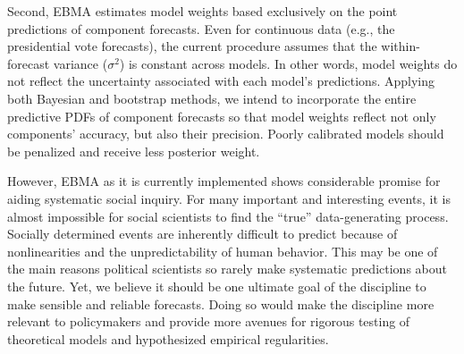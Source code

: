 Second, EBMA estimates model weights based exclusively on the point
predictions of component forecasts.  Even for continuous data (e.g.,
the presidential vote forecasts), the current procedure assumes that
the within-forecast variance ($\sigma^2$) is constant across models.
In other words, model weights do not reflect the uncertainty
associated with each model's predictions.  Applying both Bayesian and
bootstrap methods, we intend to incorporate the entire predictive PDFs
of component forecasts so that model weights reflect not only
components' accuracy, but also their precision.  Poorly calibrated
models should be penalized and receive less posterior weight.


However, EBMA as it is currently implemented shows considerable
promise for aiding systematic social inquiry.  For many important and
interesting events, it is almost impossible for social scientists to
find the ``true'' data-generating process.  Socially determined events
are inherently difficult to predict because of nonlinearities and the
unpredictability of human behavior.  This may be one of the main
reasons political scientists so rarely make systematic predictions
about the future. Yet, we believe it should be one ultimate goal of
the discipline to make sensible and reliable forecasts.  Doing so
would make the discipline more relevant to policymakers and provide
more avenues for rigorous testing of theoretical models and
hypothesized empirical regularities.

